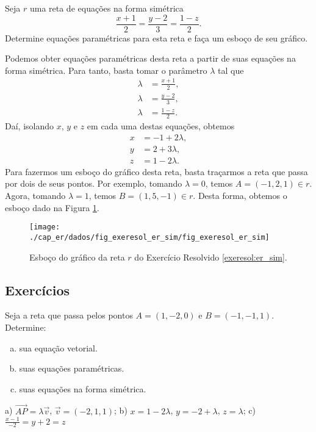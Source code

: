 \begin{exeresol}\label{exeresol:er_sim}
  Seja $r$ uma reta de equações na forma simétrica
  \begin{equation}
    \frac{x+1}{2} = \frac{y-2}{3} = \frac{1-z}{2}.
  \end{equation}
  Determine equações paramétricas para esta reta e faça um esboço de seu gráfico.
\end{exeresol}
\begin{resol}
  Podemos obter equações paramétricas desta reta a partir de suas equações na forma simétrica. Para tanto, basta tomar o parâmetro $\lambda$ tal que
  \begin{align}
    \lambda &= \frac{x+1}{2},\\
    \lambda &= \frac{y-2}{3},\\
    \lambda &= \frac{1-z}{2}.
  \end{align}
  Daí, isolando $x$, $y$ e $z$ em cada uma destas equações, obtemos
  \begin{align}
    x &= -1 + 2\lambda,\\
    y &= 2 + 3\lambda,\\
    z &= 1 - 2\lambda.
  \end{align}
  Para fazermos um esboço do gráfico desta reta, basta traçarmos a reta que passa por dois de seus pontos. Por exemplo, tomando $\lambda = 0$, temos $A = (-1,2,1)\in r$. Agora, tomando $\lambda = 1$, temos $B = (1,5,-1)\in r$. Desta forma, obtemos o esboço dado na Figura \ref{fig:exeresol_er_sim}.

  \begin{figure}[H]
    \centering
    \texttt{[image: ./cap\_er/dados/fig\_exeresol\_er\_sim/fig\_exeresol\_er\_sim]}
    \caption{Esboço do gráfico da reta $r$ do Exercício Resolvido \ref{exeresol:er_sim}.}
    \label{fig:exeresol_er_sim}
  \end{figure}
\end{resol}

\subsection*{Exercícios}

\begin{exer}
  Seja a reta que passa pelos pontos $A=(1,-2,0)$ e $B=(-1,-1,1)$. Determine:
  \begin{enumerate}[a)]
  \item sua equação vetorial.
  \item suas equações paramétricas.
  \item suas equações na forma simétrica.
  \end{enumerate}
\end{exer}
\begin{resp}
  a) $\overrightarrow{AP}=\lambda\vec{v}$, $\vec{v}=(-2,1,1)$; b) $x=1-2\lambda$, $y=-2+\lambda$, $z=\lambda$; c) $\frac{x-1}{-2}=y+2=z$
\end{resp}

